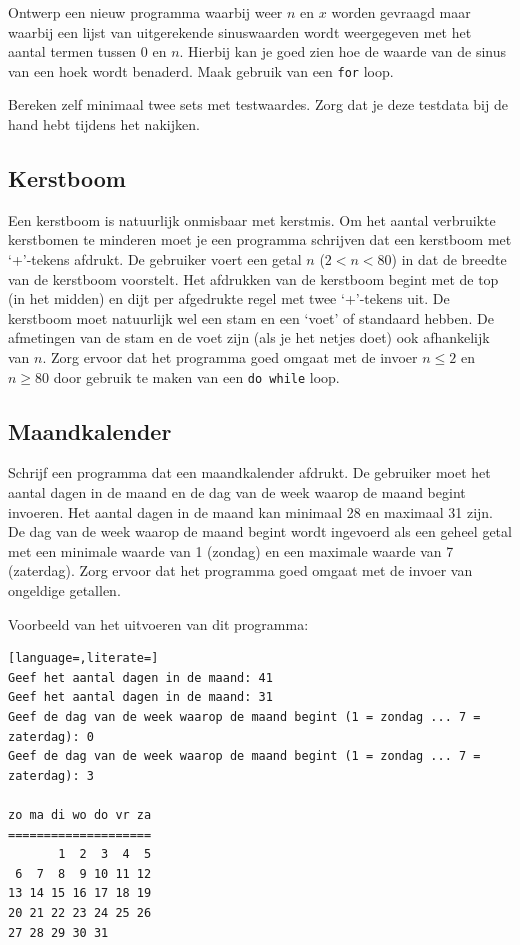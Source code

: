 \documentclass[a4paper,10pt,fleqn,twoside]{article}
\begin{document}
Ontwerp een nieuw programma waarbij weer $n$ en $x$ worden gevraagd maar waarbij een lijst van uitgerekende sinuswaarden wordt weergegeven met het aantal termen tussen $0$ en $n$. Hierbij kan je goed zien hoe de waarde van de sinus van een hoek wordt benaderd. Maak gebruik van een \lstinline|for| loop.

Bereken zelf minimaal twee sets met testwaardes. Zorg dat je deze testdata bij de hand hebt tijdens het nakijken.

\subsection{Kerstboom}
Een kerstboom is natuurlijk onmisbaar met kerstmis. Om het aantal verbruikte kerstbomen te minderen moet je een programma schrijven dat een kerstboom met `+’-tekens afdrukt. De gebruiker voert een getal $n$ ($2 < n < 80$) in dat de breedte van de kerstboom voorstelt. Het afdrukken van de kerstboom begint met de top (in het midden) en dijt per afgedrukte regel met twee `+’-tekens uit. De kerstboom moet natuurlijk wel een stam en een ‘voet’ of standaard hebben. De afmetingen van de stam en de voet zijn (als je het netjes doet) ook afhankelijk van $n$. Zorg ervoor dat het programma goed omgaat met de invoer $n \leq 2$ en $n \geq 80$ door gebruik te maken van een \lstinline|do while| loop.


\subsection{Maandkalender}
Schrijf een programma dat een maandkalender afdrukt. De gebruiker moet het aantal dagen in de maand en de dag van de week waarop de maand begint invoeren. Het aantal dagen in de maand kan minimaal 28 en maximaal 31 zijn. De dag van de week waarop de maand begint wordt ingevoerd als een geheel getal met een minimale waarde van 1 (zondag) en een maximale waarde van 7 (zaterdag). Zorg ervoor dat het programma goed omgaat met de invoer van ongeldige getallen.

Voorbeeld van het uitvoeren van dit programma:

\begin{lstlisting}[language=,literate=]
Geef het aantal dagen in de maand: 41
Geef het aantal dagen in de maand: 31
Geef de dag van de week waarop de maand begint (1 = zondag ... 7 = zaterdag): 0
Geef de dag van de week waarop de maand begint (1 = zondag ... 7 = zaterdag): 3

zo ma di wo do vr za
====================
       1  2  3  4  5
 6  7  8  9 10 11 12
13 14 15 16 17 18 19
20 21 22 23 24 25 26
27 28 29 30 31
\end{lstlisting}
\end{document}

